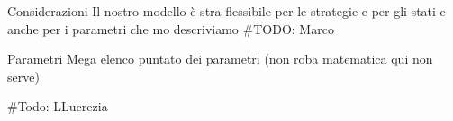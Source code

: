 

\begin{frame}{Considerazioni}
	\centering
	Il nostro modello è stra flessibile per le strategie e per gli stati e anche per i parametri che mo descriviamo
	\#TODO: Marco
\end{frame}




\begin{frame}{Parametri}
	\centering
	Mega elenco puntato dei parametri (non roba matematica qui non serve)

	\#Todo: LLucrezia
\end{frame}